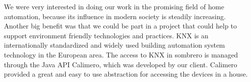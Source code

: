 We were very interested in doing our work in the promising field of home automation, because its influence in modern society is steadily increasing. Another big benefit was that we could be part in a project that could help to support environment friendly technologies and practices. KNX is an internationally standardized and widely used building automation system technology in the European area. The access to KNX in sombrero is managed through the Java API Calimero, which was developed by our client. Calimero provided a great and easy to use abstraction for accessing the devices in a house.